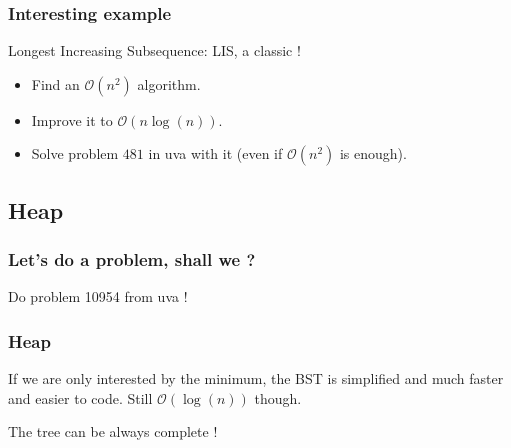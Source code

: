 \documentclass[10pt,svgnames,usenames,table]{beamer} %
\newcommand{\bigoh}{\mathcal{O}}
\begin{document}
\begin{frame}
  \frametitle{Interesting example}
  Longest Increasing Subsequence: LIS, a classic !
  \begin{itemize}
    \item Find an $\bigoh(n^2)$ algorithm.
    \item Improve it to $\bigoh(n\log(n))$.
    \item Solve problem $481$ in uva with it (even if $\bigoh(n^2)$ is enough).
  \end{itemize}
\end{frame}

\subsection{Heap}
\begin{frame}
  \frametitle{Let's do a problem, shall we ?}
  Do problem 10954 from uva !
\end{frame}
\begin{frame}
  \frametitle{Heap}
  If we are only interested by the minimum, the BST is simplified and much faster and easier to code.
  Still $\bigoh(\log(n))$ though.

  The tree can be always complete !
  \begin{center}
  \end{center}
\end{frame}
\end{document}

